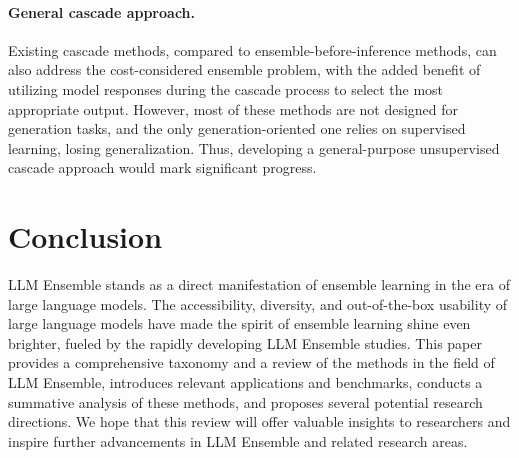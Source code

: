 \documentclass{article}
\begin{document}
\paragraph{General cascade approach.}
Existing cascade methods, compared to ensemble-before-inference methods, can also address the cost-considered ensemble problem, with the added benefit of utilizing model responses during the cascade process to select the most appropriate output.
However, most of these methods are not designed for generation tasks, and the only generation-oriented one relies on supervised learning, losing generalization.
Thus, developing a general-purpose unsupervised cascade approach would mark significant progress.





\section{Conclusion}

LLM Ensemble stands as a direct manifestation of ensemble learning in the era of large language models. 
The accessibility, diversity, and out-of-the-box usability of large language models have made the spirit of ensemble learning shine even brighter, fueled by the rapidly developing LLM Ensemble studies.
This paper provides a comprehensive taxonomy and a review of the methods in the field of LLM Ensemble, introduces relevant applications and benchmarks, conducts a summative analysis of these methods, and proposes several potential research directions.
We hope that this review will offer valuable insights to researchers and inspire further advancements in LLM Ensemble and related research areas.






% 
{{\footnotesize}}
\end{document}
